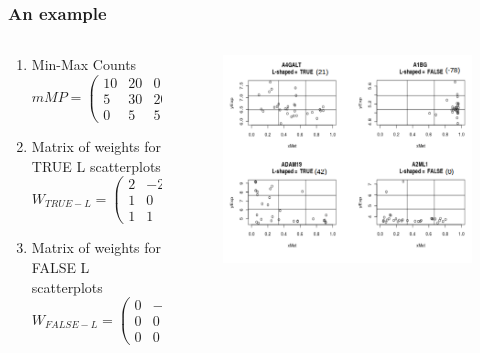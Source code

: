 \documentclass[handout]{beamer}
\begin{document}
\begin{frame}
	\frametitle{An example}

\begin{columns}%
	\begin{column}[t]{0.4\textwidth}%

\begin{enumerate}

\item Min-Max Counts
$$
mMP =\left(\begin{smallmatrix}
	10 & 20 & 0\\ 
	5 & 30 & 20\\ 
	0 & 5 & 5
\end{smallmatrix}\right)
$$

\item Matrix of weights for TRUE L scatterplots
$$
W_{TRUE-L} =\left(\begin{smallmatrix}
2 & -2 & -25\\ 
1 & 0 & -2\\ 
1 & 1 & 2
\end{smallmatrix}\right)
$$

\item Matrix of weights for FALSE L scatterplots
$$
W_{FALSE-L} =\left(\begin{smallmatrix}
0 & -2 & -25\\ 
0 & 0 & -2\\ 
0 & 0 & 0
\end{smallmatrix}\right)
$$

\end{enumerate}

	\end{column}
	\begin{column}[t]{0.6\textwidth}%
		\bigskip
		\begin{center}
			\begin{figure}[h]          
				\includegraphics[width=\textwidth]{images/LshapeAndNonLshapeScored}
			\end{figure}
		\end{center}
	\end{column}
\end{columns}	
	
\end{frame}
\end{document}
